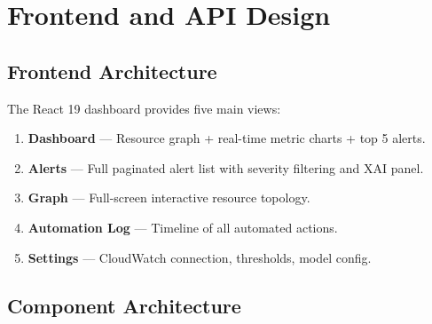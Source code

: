 \documentclass[12pt,a4paper]{report}
\begin{document}
\chapter{Frontend and API Design}

\section{Frontend Architecture}

The React 19 dashboard provides five main views:

\begin{enumerate}
  \item \textbf{Dashboard} — Resource graph + real-time metric charts +
        top 5 alerts.
  \item \textbf{Alerts} — Full paginated alert list with severity
        filtering and XAI panel.
  \item \textbf{Graph} — Full-screen interactive resource topology.
  \item \textbf{Automation Log} — Timeline of all automated actions.
  \item \textbf{Settings} — CloudWatch connection, thresholds, model config.
\end{enumerate}

\section{Component Architecture}
\end{document}

